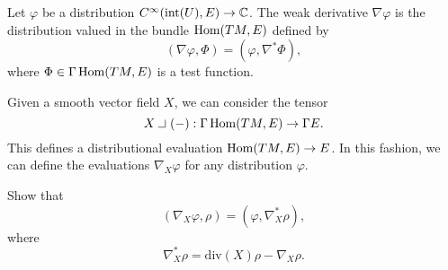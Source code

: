 \documentclass{amsart}
\begin{document}
\begin{defn}
  Let $\varphi$ be a distribution $C^{\infty}(\text{int}(U), E)\to \mathbb{C}$. The weak derivative $\nabla \varphi$ is the distribution valued in the bundle $\operatorname{\mathrm{Hom}}(TM,E)$ defined by
  \begin{equation*}
    (\nabla \varphi,\Phi)=(\varphi,\nabla^{*}\Phi),
  \end{equation*}
  where $\Phi\in \Gamma\operatorname{\mathrm{Hom}}(TM,E)$ is a test function.

  Given a smooth vector field $X$, we can consider the tensor
  \begin{equation*}
    X\intprod(-):\Gamma\Hom (TM,E)\to \Gamma E.
  \end{equation*}
  This defines a distributional evaluation $\operatorname{\mathrm{Hom}}(TM,E)\to E$. In this fashion, we can define the evaluations $\nabla_{X}\varphi$ for any distribution $\varphi$.
  \begin{xca}
    Show that
    \begin{equation*}
      (\nabla_{X}\varphi,\rho)=(\varphi,\nabla_{X}^{*}\rho),
    \end{equation*}
    where
    \begin{equation*}
      \nabla_{X}^{*}\rho=\text{div}(X)\rho-\nabla_{X}\rho.
    \end{equation*}    
  \end{xca}  
\end{defn}
\end{document}
